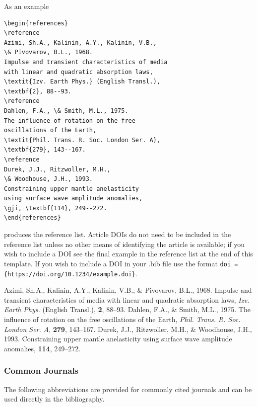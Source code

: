 \documentclass{gji}
\begin{document}
As an example
\begin{verbatim}
\begin{references}
\reference
Azimi, Sh.A., Kalinin, A.Y., Kalinin, V.B.,
\& Pivovarov, B.L., 1968.
Impulse and transient characteristics of media
with linear and quadratic absorption laws,
\textit{Izv. Earth Phys.} (English Transl.),
\textbf{2}, 88--93.
\reference
Dahlen, F.A., \& Smith, M.L., 1975.
The influence of rotation on the free
oscillations of the Earth,
\textit{Phil. Trans. R. Soc. London Ser. A},
\textbf{279}, 143--167.
\reference
Durek, J.J., Ritzwoller, M.H.,
\& Woodhouse, J.H., 1993.
Constraining upper mantle anelasticity
using surface wave amplitude anomalies,
\gji, \textbf{114}, 249--272.
\end{references}
\end{verbatim}
produces the reference list. Article DOIs do not need to be included in the reference list unless no other means of identifying the article is available; if you wish to include a DOI see the final example in the reference list at the end of this template. If you wish to include a DOI in your .bib file use the format \verb"doi = {https://doi.org/10.1234/example.doi}".
\begin{references}
Azimi, Sh.A., Kalinin, A.Y., Kalinin, V.B.,
\& Pivovarov, B.L., 1968.
Impulse and transient characteristics of media
with linear and  quadratic absorption laws,
\textit{Izv. Earth Phys.} (English Transl.),
\textbf{2}, 88--93.
Dahlen, F.A., \& Smith, M.L., 1975.
The influence of rotation on the free oscillations of the Earth,
\textit{Phil. Trans. R. Soc. London Ser. A}, \textbf{279}, 143--167.
Durek, J.J., Ritzwoller, M.H., \& Woodhouse, J.H., 1993.
Constraining upper mantle anelasticity
using surface wave amplitude anomalies,
\gji \textbf{114}, 249--272.
\end{references}

\subsubsection{Common Journals}

The following abbreviations are provided for commonly cited
journals and can be used directly in the bibliography.
\end{document}
